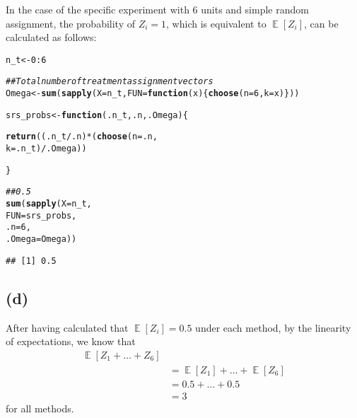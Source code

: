 \documentclass[11pt]{article}\usepackage[]{graphicx}\usepackage[]{color}
\makeatletter
\newcommand{\hlnum}[1]{\textcolor[rgb]{0.686,0.059,0.569}{#1}}%
\newcommand{\hlcom}[1]{\textcolor[rgb]{0.678,0.584,0.686}{\textit{#1}}}%
\newcommand{\hlopt}[1]{\textcolor[rgb]{0,0,0}{#1}}%
\newcommand{\hlstd}[1]{\textcolor[rgb]{0.345,0.345,0.345}{#1}}%
\newcommand{\hlkwa}[1]{\textcolor[rgb]{0.161,0.373,0.58}{\textbf{#1}}}%
\newcommand{\hlkwb}[1]{\textcolor[rgb]{0.69,0.353,0.396}{#1}}%
\newcommand{\hlkwc}[1]{\textcolor[rgb]{0.333,0.667,0.333}{#1}}%
\newcommand{\hlkwd}[1]{\textcolor[rgb]{0.737,0.353,0.396}{\textbf{#1}}}%
\newenvironment{kframe}{%
 \def\at@end@of@kframe{}%
 \ifinner\ifhmode%
  \def\at@end@of@kframe{\end{minipage}}%
  \begin{minipage}{\columnwidth}%
 \fi\fi%
 \def\FrameCommand##1{\hskip\@totalleftmargin \hskip-\fboxsep
 \colorbox{shadecolor}{##1}\hskip-\fboxsep
     \hskip-\linewidth \hskip-\@totalleftmargin \hskip\columnwidth}%
 \MakeFramed {\advance\hsize-\width
   \@totalleftmargin\z@ \linewidth\hsize
   \@setminipage}}%
 {\par\unskip\endMakeFramed%
 \at@end@of@kframe}
\newenvironment{knitrout}{}{} %
\theoremstyle{newstyle}
\DeclareMathOperator{\E}{\mathbb{E}}
\makeatother
\begin{document}
In the case of the specific experiment with $6$ units and simple random assignment, the probability of $Z_i = 1$, which is equivalent to $\E\left[Z_i\right]$, can be calculated as follows:

\begin{knitrout}
\color{fgcolor}\begin{kframe}
\begin{alltt}
\hlstd{n_t} \hlkwb{<-} \hlnum{0}\hlopt{:}\hlnum{6}

\hlcom{## Total number of treatment assignment vectors}
\hlstd{Omega} \hlkwb{<-} \hlkwd{sum}\hlstd{(}\hlkwd{sapply}\hlstd{(}\hlkwc{X} \hlstd{= n_t,}\hlkwc{FUN} \hlstd{=} \hlkwa{function}\hlstd{(}\hlkwc{x}\hlstd{) \{} \hlkwd{choose}\hlstd{(}\hlkwc{n} \hlstd{=} \hlnum{6}\hlstd{,} \hlkwc{k} \hlstd{= x)\}))}

\hlstd{srs_probs} \hlkwb{<-} \hlkwa{function}\hlstd{(}\hlkwc{.n_t}\hlstd{,} \hlkwc{.n}\hlstd{,} \hlkwc{.Omega}\hlstd{) \{}

  \hlkwd{return}\hlstd{((.n_t} \hlopt{/} \hlstd{.n)} \hlopt{*} \hlstd{(}\hlkwd{choose}\hlstd{(}\hlkwc{n} \hlstd{= .n,}
                       \hlkwc{k} \hlstd{= .n_t)} \hlopt{/} \hlstd{.Omega))}

  \hlstd{\}}

\hlcom{## 0.5}
\hlkwd{sum}\hlstd{(}\hlkwd{sapply}\hlstd{(}\hlkwc{X} \hlstd{= n_t,}
       \hlkwc{FUN} \hlstd{= srs_probs,}
       \hlkwc{.n} \hlstd{=} \hlnum{6}\hlstd{,}
       \hlkwc{.Omega} \hlstd{= Omega))}
\end{alltt}
\begin{verbatim}
## [1] 0.5
\end{verbatim}
\end{kframe}
\end{knitrout}

\subsection{(d)}

After having calculated that $\E\left[Z_i\right] = 0.5$ under each method, by the linearity of expectations, we know that
\begin{align*}
\E\left[Z_1 + \dots + Z_6\right] \\
& = \E\left[Z_1\right] + \dots + \E\left[Z_6\right] \\
& = 0.5 + \dots + 0.5 \\
& = 3
\end{align*}
for all methods.
\end{document}
